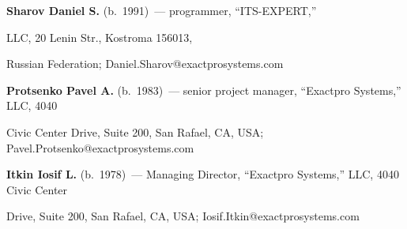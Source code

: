 \noindent


  \textbf{Sharov Daniel S.} (b.\ 1991)~--- programmer, ``ITS-EXPERT,''


  LLC, 20 Lenin Str., Kostroma 156013,


  Russian Federation; Daniel.Sharov@exactprosystems.com





  \vspace*{3pt}





\noindent


\textbf{Protsenko Pavel A.} (b.\ 1983)~--- senior project manager, ``Exactpro Systems,'' LLC,  4040


Civic Center Drive, Suite 200, San Rafael, CA,  USA; Pavel.Protsenko@exactprosystems.com





\vspace*{3pt}





\noindent


\textbf{Itkin Iosif L.} (b.\ 1978)~---  Managing Director, ``Exactpro Systems,'' LLC, 4040 Civic Center


Drive, Suite 200, San Rafael, CA,  USA; Iosif.Itkin@exactprosystems.com





\label{end\stat}





\renewcommand{\bibname}{\protect\rmfamily Литература}